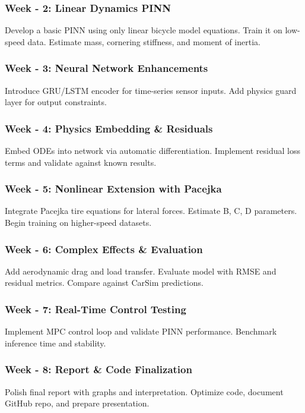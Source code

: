 \documentclass{article}
\begin{document}
\subsubsection*{Week - 2: Linear Dynamics PINN}
Develop a basic PINN using only linear bicycle model equations. Train it on low-speed data. Estimate mass, cornering stiffness, and moment of inertia.

\subsubsection*{Week - 3: Neural Network Enhancements}
Introduce GRU/LSTM encoder for time-series sensor inputs. Add physics guard layer for output constraints.

\subsubsection*{Week - 4: Physics Embedding \& Residuals}
Embed ODEs into network via automatic differentiation. Implement residual loss terms and validate against known results.

\subsubsection*{Week - 5: Nonlinear Extension with Pacejka}
Integrate Pacejka tire equations for lateral forces. Estimate B, C, D parameters. Begin training on higher-speed datasets.

\subsubsection*{Week - 6: Complex Effects \& Evaluation}
Add aerodynamic drag and load transfer. Evaluate model with RMSE and residual metrics. Compare against CarSim predictions.

\subsubsection*{Week - 7: Real-Time Control Testing}
Implement MPC control loop and validate PINN performance. Benchmark inference time and stability.

\subsubsection*{Week - 8: Report \& Code Finalization}
Polish final report with graphs and interpretation. Optimize code, document GitHub repo, and prepare presentation.
\end{document}
